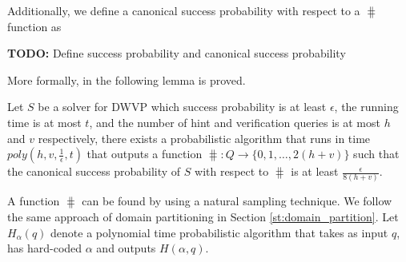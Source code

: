 Additionally, we define a canonical success probability with respect to a $\hash$ function as
\begin{todo}
  \textbf{TODO:} Define success probability and canonical success probability
\end{todo}

More formally, in \cite{Dodis:2009:SAI:1530441.1530450} the following lemma is proved.
\begin{lemma}
Let $S$ be a solver for DWVP which success probability is at least $\epsilon$, the running time is at most $t$,
and the number of hint and verification queries is at most $h$ and $v$ respectively,
there exists a probabilistic algorithm that runs in time $poly(h,v,\frac{1}{\epsilon},t)$
that outputs a function $\hash : Q \rightarrow \{0,1, \dotsc, 2(h+v)\}$ such that the canonical
success probability of $S$ with respect to $\hash$ is at least $\frac{\epsilon}{8(h+v)}$.
\end{lemma}
A function $\hash$ can be found by using a natural sampling technique.
We follow the same approach of domain partitioning in Section \ref{st:domain_partition}.
%
Let $H_{\alpha}(q)$ denote a polynomial time probabilistic algorithm that takes as input $q$,
has hard-coded $\alpha$ and outputs $H(\alpha, q)$.
%
